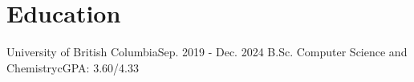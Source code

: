 \section{Education}
\resumeSubHeadingListStart
\resumeSubheading
{University of British Columbia}{Sep. 2019 - Dec. 2024}
{B.Sc. Computer Science and Chemistry}{cGPA: 3.60/4.33}
\resumeItemListStart
{}
\resumeItemListEnd
\resumeSubHeadingListEnd
